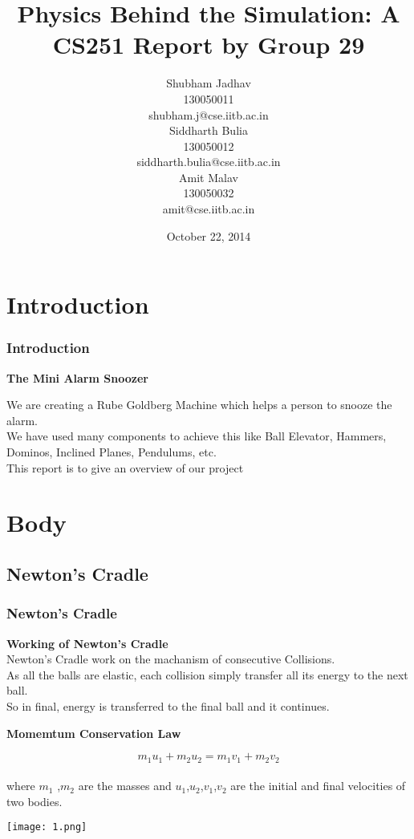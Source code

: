 \documentclass{beamer}
\title{Physics Behind the Simulation: A CS251 Report by Group 29}
\author{Shubham Jadhav \\
{\tiny 130050011}  \\
	{\tiny shubham.j@cse.iitb.ac.in}  \\
    Siddharth Bulia \\
    {\tiny 130050012}  \\
   { \tiny siddharth.bulia@cse.iitb.ac.in } \\
    Amit Malav  \\
    {\tiny 130050032}  \\
    {\tiny amit@cse.iitb.ac.in}
}
\date{October 22, 2014}
\begin{document}
\begin{frame}
\titlepage
\end{frame}

\section{Introduction}

\begin{frame}
\frametitle{Introduction}
\begin{center}
 {\bf The Mini Alarm Snoozer } 

\end{center}
\vskip 0.5in
\pause
We are creating a Rube Goldberg Machine which helps a person to snooze
the alarm. \\
\pause 
We have used many components to achieve this like Ball Elevator, Hammers,
Dominos, Inclined Planes, Pendulums, etc.
\\\pause
This report is to give an overview of our project

\end{frame}






\section{Body}

\subsection{Newton's Cradle}
\begin{frame}
\frametitle{Newton's Cradle}
{\bf Working of Newton's Cradle\cite{ref_1}}
\\\pause
Newton's Cradle work on the machanism of consecutive Collisions.
\\\pause
As all the balls are elastic, each collision simply transfer all its energy to the next ball.
\pause\\
So in final, energy is transferred to the final ball and it continues.
\pause\\
\begin{center}
{\bf Momemtum Conservation Law}
\end{center}
\begin{equation} m_1 u_{1} + m_2 u_{2} = m_1 v_{1} + m_2 v_{2}  \end{equation} 
\\
where $m_1$ ,$m_2$ are the masses and $u_1$,$u_2$,$v_1$,$v_2$ are the initial and final velocities of two bodies.
\begin{center}
\texttt{[image: 1.png]}
\end{center}
\end{frame}
\end{document}
